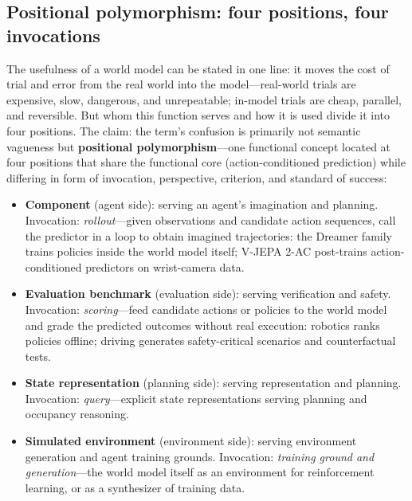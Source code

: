 \documentclass[10pt]{article}
\begin{document}
\subsection{Positional polymorphism: four positions, four invocations}\label{sec:positions}

The usefulness of a world model can be stated in one line: it moves the cost of trial and error from the real world into the model---real-world trials are expensive, slow, dangerous, and unrepeatable; in-model trials are cheap, parallel, and reversible. But whom this function serves and how it is used divide it into four positions. The claim: the term's confusion is primarily not semantic vagueness but \textbf{positional polymorphism}---one functional concept located at four positions that share the functional core (action-conditioned prediction) while differing in form of invocation, perspective, criterion, and standard of success:

\begin{itemize}
\item \textbf{Component} (agent side): serving an agent's imagination and planning. Invocation: \emph{rollout}---given observations and candidate action sequences, call the predictor in a loop to obtain imagined trajectories: the Dreamer family trains policies inside the world model itself\cite{hafner2025inside}; V-JEPA 2-AC post-trains action-conditioned predictors on wrist-camera data\cite{meta2025vjepa2}.
\item \textbf{Evaluation benchmark} (evaluation side): serving verification and safety. Invocation: \emph{scoring}---feed candidate actions or policies to the world model and grade the predicted outcomes without real execution: robotics ranks policies offline\cite{onex2026worldmodel}; driving generates safety-critical scenarios and counterfactual tests\cite{wayve2025gaia2}.
\item \textbf{State representation} (planning side): serving representation and planning. Invocation: \emph{query}---explicit state representations serving planning and occupancy reasoning\cite{tolman1948,okeefe1978}.
\item \textbf{Simulated environment} (environment side): serving environment generation and agent training grounds. Invocation: \emph{training ground and generation}---the world model itself as an environment for reinforcement learning\cite{qwen2026agentworld,deepmind2025genie3}, or as a synthesizer of training data\cite{nvidia2025synthetic}.
\end{itemize}
\end{document}
